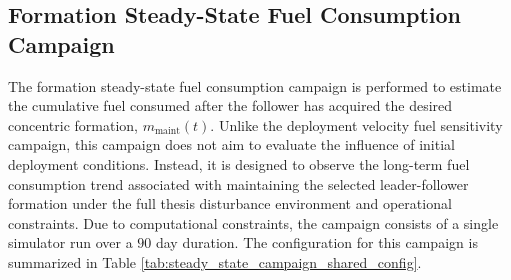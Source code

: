 \subsection{Formation Steady-State Fuel Consumption Campaign}
\label{sec_steady_state_campaign}

The formation steady-state fuel consumption campaign is performed to estimate the cumulative fuel consumed after the follower has acquired the desired concentric formation, $m_{\mathrm{maint}}(t)$. Unlike the deployment velocity fuel sensitivity campaign, this campaign does not aim to evaluate the influence of initial deployment conditions. Instead, it is designed to observe the long-term fuel consumption trend associated with maintaining the selected leader-follower formation under the full thesis disturbance environment and operational constraints. Due to computational constraints, the campaign consists of a single simulator run over a $90$ day duration. The configuration for this campaign is summarized in Table \ref{tab:steady_state_campaign_shared_config}.

